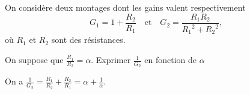 

\finEntrainement



\newpage 




\hauteurLargeurCadreReponse		{8mm}{3.5cm}
\typeEntrainement				{} %
\initialisationEntrainement

\debutEntrainement

On considère deux montages dont les gains valent respectivement
\[
G_1 = 1+\frac{R_2}{R_1}
\quad\text{et}\quad
G_2 = \frac{R_1R_2}{{R_1}^2+{R_2}^2},
\]
où $R_1$ et $R_2$ sont des résistances.



\begin{enonce}
On suppose que $\frac{R_1}{R_2} = \alpha$. Exprimer $\frac{1}{G_2}$ en fonction de $\alpha$
\end{enonce}


\begin{corrige}
On a $\frac{1}{G_2} = \frac{R_1}{R_2} +  \frac{R_2}{R_1} = \alpha + \frac{1}{\alpha}$.
\end{corrige}




